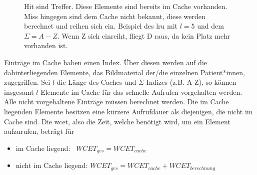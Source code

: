 \begin{figure}[b]\centering
{}
\caption[Beispiel des \ac{lru}]{Hit sind Treffer. Diese Elemente sind bereits im Cache vorhanden. Miss hingegen sind dem Cache nicht bekannt, diese werden berechnet und reihen sich ein. Beispiel des \ac{lru} mit $l=5$ und dem $\Sigma=A-Z$. Wenn Z sich einreiht, fliegt D raus, da kein Platz mehr vorhanden ist.}\label{cap:lrucache}
\end{figure}\label{fig:lrucache}

Einträge im Cache haben einen Index. Über diesen werden auf die dahinterliegenden Elemente, das Bildmaterial der/die einzelnen Patient*innen, zugegriffen. Sei $l$ die Länge des Caches und $\Sigma$ Indizes (z.B. A-Z), so können insgesamt $l$ Elemente im Cache für das schnelle Aufrufen vorgehalten werden. Alle nicht vorgehaltene Einträge müssen berechnet werden. Die im Cache liegenden Elemente besitzen eine kürzere Aufrufdauer als diejenigen, die nicht im Cache sind. Die \ac{wcet}, also die Zeit, welche benötigt wird, um ein Element aufzurufen, beträgt für

\begin{itemize}
  \setlength\itemsep{-0.5em}
\item im Cache liegend: \qquad\, $WCET_{ges}=WCET_{cache}$
\item nicht im Cache liegend: $WCET_{ges}=WCET_{cache} + WCET_{berechnung}$
\end{itemize}

